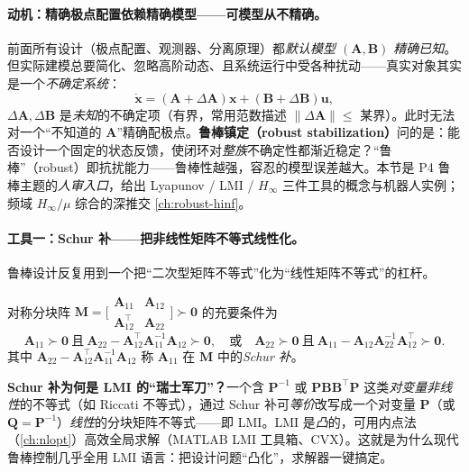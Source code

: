 \paragraph{动机：精确极点配置依赖精确模型——可模型从不精确。}
前面所有设计（极点配置、观测器、分离原理）都\emph{默认模型 $(\mathbf A,\mathbf B)$ 精确已知}。但实际建模总要简化、忽略高阶动态、且系统运行中受各种扰动——真实对象其实是一个\emph{不确定系统}\cite{zhang2017modern}：
\begin{equation}
  \dot{\mathbf x}=(\mathbf A+\Delta\mathbf A)\mathbf x+(\mathbf B+\Delta\mathbf B)\mathbf u,
  \label{eq:syn-uncertain}
\end{equation}
$\Delta\mathbf A,\Delta\mathbf B$ 是\emph{未知}的不确定项（有界，常用范数描述 $\|\Delta\mathbf A\|\le$ 某界）。此时无法对一个“不知道的 $\mathbf A$”精确配极点。\textbf{鲁棒镇定（robust stabilization）}问的是：能否设计一个固定的状态反馈，使闭环对\emph{整族}不确定性都渐近稳定？“鲁棒”（robust）即抗扰能力——鲁棒性越强，容忍的模型误差越大。本节是 P4 鲁棒主题的\emph{人审入口}，给出 Lyapunov / LMI / $H_\infty$ 三件工具的概念与机器人实例；频域 $H_\infty/\mu$ 综合的深推交 \cref{ch:robust-hinf}。

\paragraph{工具一：Schur 补——把非线性矩阵不等式线性化。}
鲁棒设计反复用到一个把“二次型矩阵不等式”化为“线性矩阵不等式”的杠杆。

\begin{lemma}[Schur 补]
\label{lem:syn-schur}
对称分块阵 $\mathbf M=\big[\begin{smallmatrix}\mathbf A_{11}&\mathbf A_{12}\\\mathbf A_{12}^\top&\mathbf A_{22}\end{smallmatrix}\big]\succ\mathbf 0$ 的充要条件为\cite{zhang2017modern,boyd1994linear}
\begin{equation}
  \mathbf A_{11}\succ\mathbf 0\ \text{且}\ \mathbf A_{22}-\mathbf A_{12}^\top\mathbf A_{11}^{-1}\mathbf A_{12}\succ\mathbf 0,\quad\text{或}\quad \mathbf A_{22}\succ\mathbf 0\ \text{且}\ \mathbf A_{11}-\mathbf A_{12}\mathbf A_{22}^{-1}\mathbf A_{12}^\top\succ\mathbf 0.
  \label{eq:syn-schur}
\end{equation}
其中 $\mathbf A_{22}-\mathbf A_{12}^\top\mathbf A_{11}^{-1}\mathbf A_{12}$ 称 $\mathbf A_{11}$ 在 $\mathbf M$ 中的\emph{Schur 补}。
\end{lemma}

\begin{insight}
\textbf{Schur 补为何是 LMI 的“瑞士军刀”？}\;一个含 $\mathbf P^{-1}$ 或 $\mathbf P\mathbf B\mathbf B^\top\mathbf P$ 这类\emph{对变量非线性}的不等式（如 Riccati 不等式），通过 Schur 补可\emph{等价}改写成一个对变量 $\mathbf P$（或 $\mathbf Q=\mathbf P^{-1}$）\emph{线性}的分块矩阵不等式——即 LMI。LMI 是\emph{凸}的，可用内点法（\cref{ch:nlopt}）高效全局求解（MATLAB LMI 工具箱、CVX）。这就是为什么现代鲁棒控制几乎全用 LMI 语言：把设计问题“凸化”，求解器一键搞定。
\end{insight}

